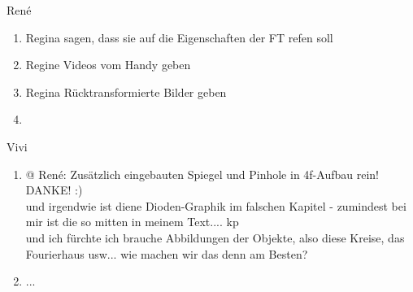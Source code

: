 
René
\begin{enumerate}
	\item Regina sagen, dass sie auf die Eigenschaften der FT refen soll
	\item Regine Videos vom Handy geben
	\item Regina Rücktransformierte Bilder geben
	\item 
\end{enumerate}

Vivi
\begin{enumerate}
	\item @ René: Zusätzlich eingebauten Spiegel und Pinhole in 4f-Aufbau rein! DANKE!  :) \\
	und irgendwie ist diene Dioden-Graphik im falschen Kapitel - zumindest bei mir ist die so mitten in meinem Text.... kp  \\
	und ich fürchte ich brauche Abbildungen der Objekte, also diese Kreise, das Fourierhaus usw... wie machen wir das denn am Besten?   
	\item ...
\end{enumerate}